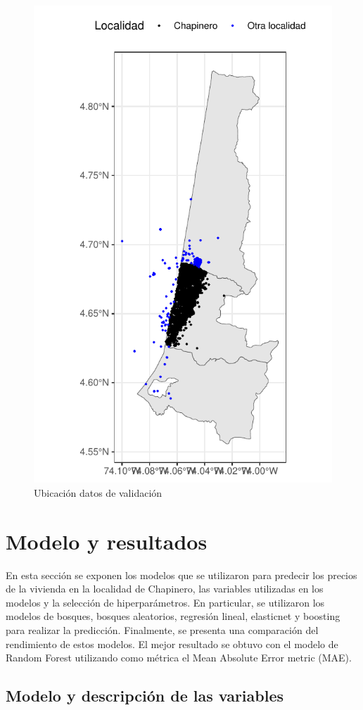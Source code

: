 \documentclass[
  11pt,
  letterpaper,
]{article}
\begin{document}
\begin{figure}[H]
\includegraphics[width=0.7\linewidth]{../views/figures/train_dots} \caption{Ubicación datos de validación}\label{fig:train-chapi-dots}
\end{figure}

\hypertarget{modelo-y-resultados}{%
\section{Modelo y resultados}\label{modelo-y-resultados}}

En esta sección se exponen los modelos que se utilizaron para predecir los precios de la vivienda en la localidad de Chapinero, las variables utilizadas en los modelos y la selección de hiperparámetros. En particular, se utilizaron los modelos de bosques, bosques aleatorios, regresión lineal, elasticnet y boosting para realizar la predicción. Finalmente, se presenta una comparación del rendimiento de estos modelos. El mejor resultado se obtuvo con el modelo de Random Forest utilizando como métrica el Mean Absolute Error metric (MAE).

\hypertarget{modelo-y-descripciuxf3n-de-las-variables}{%
\subsection{Modelo y descripción de las variables}\label{modelo-y-descripciuxf3n-de-las-variables}}
\end{document}
